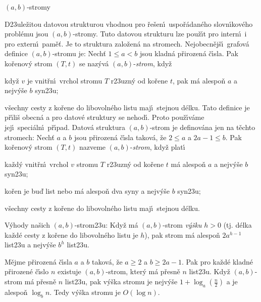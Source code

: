 \heading
$(a,b)$-stromy
\endheading

\flushpar D\accent23ule\v zitou datovou strukturou vhodnou pro 
\v re\v sen\'\i\ uspo\v r\'a\-dan\'e\-ho slovn\'\i\-ko\-v\'e\-ho probl\'emu jsou 
$(a,b)$-stromy. Tuto datovou strukturu lze pou\v z\'\i t pro intern\'\i\ i 
pro extern\'\i\ pam\v e\v t. Je to struktura zalo\v zen\'a na stromech. 
Nejobecn\v ej\v s\'\i\ grafov\'a defini\-ce $(a,b)$-stromu je:\newline 
Nech\v t $1\le a<b$ jsou kladn\'a p\v rirozen\'a \v c\'\i sla. Pak ko\v renov\'y 
strom $(T,t)$ se naz\'yv\'a $(a,b)$-\emph{strom}, kdy\v z 
\roster
\item
kdy\v z $v$ je vnit\v rn\'\i\ vrchol stromu $T$ r\accent23uzn\'y od 
ko\v rene $t$, pak m\'a alespo\v n $a$ a nejv\'y\v se $b$ syn\accent23u;
\item
v\v sechny cesty z ko\v rene do libovoln\'eho listu maj\'\i\ 
stejnou d\'elku.
\endroster
Tato definice je p\v r\'\i li\v s obecn\'a a pro datov\'e struktury se 
nehod\'\i . Proto pou\v z\'\i v\'ame jej\'\i\ speci\'aln\'\i\ p\v r\'\i pad. Datov\'a 
struktura $(a,b)$-strom je definov\'ana jen na t\v echto stromech: 
Nech\v t $a$ a $b$ jsou p\v rirozen\'a \v c\'\i sla takov\'a, \v ze $
2\le a$ a 
$2a-1\le b$. Pak ko\v renov\'y 
strom $(T,t)$ nazveme $(a,b)$-\emph{strom}, kdy\v z plat\'\i\ 
\roster
\item
ka\v zd\'y vnit\v rn\'\i\ vrchol $v$ stromu $T$ r\accent23uzn\'y od 
ko\v rene $t$ m\'a alespo\v n $a$ a nejv\'y\v se $b$ syn\accent23u;
\item
ko\v ren je bu\v d list nebo m\'a alespo\v n dva syny a nejv\'y\v se $
b$ 
syn\accent23u;
\item
v\v sechny cesty z ko\v rene do libovoln\'eho listu maj\'\i\ 
stejnou d\'elku.
\endroster
\medskip

\flushpar V\'yhody na\v sich $(a,b)$-strom\accent23u:\newline 
Kdy\v z m\'a $(a,b)$-strom \emph{v\'y\v sku} $h>0$ (tj. d\'elka ka\v zd\'e 
cesty z ko\v rene do libovoln\'eho listu je $h$), pak 
strom m\'a alespo\v n $2a^{h-1}$ list\accent23u a nejv\'y\v se $b^
h$ 
list\accent23u.


M\v ejme p\v rirozen\'a \v c\'\i sla $a$ a $
b$ takov\'a, 
\v ze $a\ge 2$ a $b\ge 2a-1$. Pak pro ka\v zd\'e kladn\'e p\v rirozen\'e 
\v c\'\i slo $n$ existuje $(a,b)$-strom, kter\'y m\'a p\v resn\v e $
n$ 
list\accent23u. Kdy\v z $(a,b)$-strom m\'a p\v resn\v e $n$ 
list\accent23u, pak v\'y\v ska stromu je nejv\'y\v se $1+\log_a(\frac 
n2)$ a 
je alespo\v n $\log_bn$. Tedy v\'y\v ska stromu je $O(\log n)$.
\endproclaim


